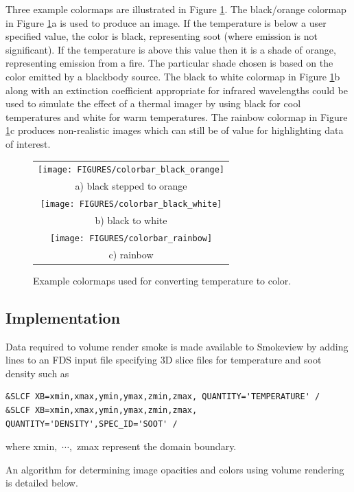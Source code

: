 {Three example colormaps  are illustrated in Figure \ref{fig:colormaps}.
The black/orange colormap in Figure \ref{fig:colormaps}a
is used to produce an image.  If the temperature is below a user specified value, the color is black, representing soot (where emission is not significant).  If the temperature is above this value then it is a shade of orange, representing emission from a fire.  The particular shade chosen is based on the color emitted by a blackbody source.
The black to white colormap in Figure \ref{fig:colormaps}b along with an extinction coefficient appropriate for infrared wavelengths could be used to simulate the effect of a thermal imager by using black for cool temperatures and white for warm temperatures.
The rainbow colormap in Figure \ref{fig:colormaps}c produces non-realistic images which can still be of value for highlighting data of interest.

\begin{figure}[\figoptions]
\begin{center}
\begin{tabular}{c}
\texttt{[image: FIGURES/colorbar\_black\_orange]}\\
a) black stepped to orange\\
\texttt{[image: FIGURES/colorbar\_black\_white]}\\
b) black to white\\
\texttt{[image: FIGURES/colorbar\_rainbow]}\\
c) rainbow
\end{tabular}
\end{center}
\caption[Example linear colormaps used for converting temperature to color.]
{Example colormaps used for converting temperature to color.}
\label{fig:colormaps}
\end{figure}

\subsection{Implementation}
Data required to volume render smoke is made available to Smokeview by adding lines to an FDS input file specifying 3D slice files for temperature and soot density such as
\begin{lstlisting}
&SLCF XB=xmin,xmax,ymin,ymax,zmin,zmax, QUANTITY='TEMPERATURE' /
&SLCF XB=xmin,xmax,ymin,ymax,zmin,zmax, QUANTITY='DENSITY',SPEC_ID='SOOT' /
\end{lstlisting}
where xmin,~$\cdots$,~zmax represent the domain boundary.

An algorithm for determining image opacities and colors using volume rendering is detailed below.

}
